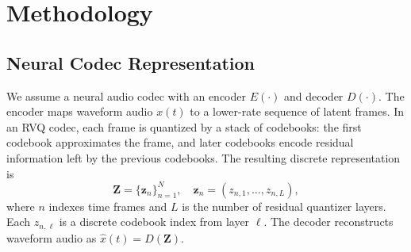 \documentclass[twoside,a4paper]{article}
\begin{document}




\section{Methodology}\label{sec:method}

\subsection{Neural Codec Representation}

We assume a neural audio codec with an encoder $E(\cdot)$ and decoder $D(\cdot)$. The encoder maps waveform audio $x(t)$ to a lower-rate sequence of latent frames. In an RVQ codec, each frame is quantized by a stack of codebooks: the first codebook approximates the frame, and later codebooks encode residual information left by the previous codebooks. The resulting discrete representation is
\begin{equation}
    \mathbf{Z} = \{ \mathbf{z}_n \}_{n=1}^{N}, \quad \mathbf{z}_n = (z_{n,1}, \dots, z_{n,L}),
\end{equation}
where $n$ indexes time frames and $L$ is the number of residual quantizer layers. Each $z_{n,\ell}$ is a discrete codebook index from layer $\ell$. The decoder reconstructs waveform audio as $\hat{x}(t) = D(\mathbf{Z})$.
\end{document}
